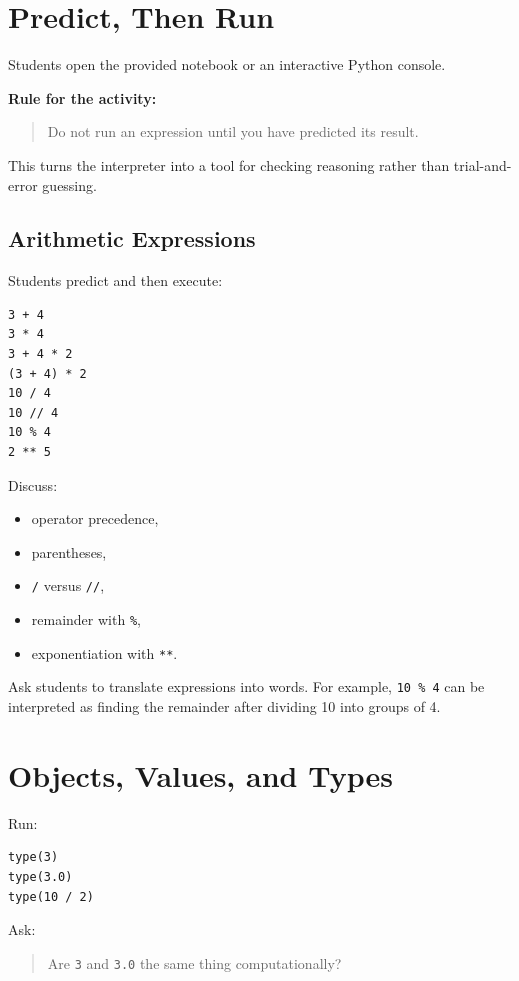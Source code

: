 \documentclass[11pt]{article}
\begin{document}
\section{Predict, Then Run}

Students open the provided notebook or an interactive Python console.

\textbf{Rule for the activity:}

\begin{quote}
Do not run an expression until you have predicted its result.
\end{quote}

This turns the interpreter into a tool for checking reasoning rather than trial-and-error guessing.

\subsection*{Arithmetic Expressions}

Students predict and then execute:

\begin{lstlisting}
3 + 4
3 * 4
3 + 4 * 2
(3 + 4) * 2
10 / 4
10 // 4
10 % 4
2 ** 5
\end{lstlisting}

Discuss:

\begin{itemize}
    \item operator precedence,
    \item parentheses,
    \item \texttt{/} versus \texttt{//},
    \item remainder with \texttt{\%},
    \item exponentiation with \texttt{**}.
\end{itemize}

Ask students to translate expressions into words. For example, \texttt{10 \% 4} can be interpreted as finding the remainder after dividing 10 into groups of 4.

\section{Objects, Values, and Types}

Run:

\begin{lstlisting}
type(3)
type(3.0)
type(10 / 2)
\end{lstlisting}

Ask:

\begin{quote}
Are \texttt{3} and \texttt{3.0} the same thing computationally?
\end{quote}
\end{document}
